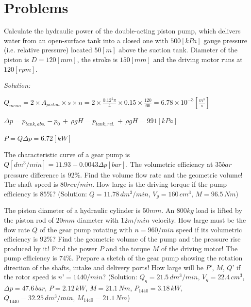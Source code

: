 \section{Problems}


Calculate the hydraulic power of the double-acting piston pump, which delivers water from an open-surface tank into a closed one with $500[kPa]$ gauge pressure (i.e. relative pressure) located $50[m]$ above the suction tank. Diameter of the piston is $D=120[mm]$, the stroke is $150[mm]$ and the driving motor runs at $120[rpm]$.

\emph{Solution:} 

$Q_{mean}=2 \times A_{piston} \times s \times n=2\times \frac{0.12^2 \pi}{4} \times 0.15 \times \frac{120}{60} =6.78 \times 10^{-3} [\frac{m^3}{s}]$

$\Delta p=p_{tank,abs.}-p_0\,+\,\rho g H=p_{tank,rel.}\,+\,\rho g H=991[kPa]$

$P=Q \Delta p=6.72[kW]$


\vspace{1cm}

The characteristic curve of a gear pump is $Q[dm^3/min]=11.93-0.0043 \Delta p [bar]$. The volumetric efficiency at $35 bar$ pressure difference is $92\%$. Find the volume flow rate and the geometric volume! The shaft speed is $80 rev/min$. How large is the driving torque if the pump efficiency is $85\%$? (Solution: $Q=11.78\,dm^3/min$, $V_g = 160\,cm^3$, $M = 96.5\,Nm$)


\vspace{1cm}

The piston diameter of a hydraulic cylinder is $50 mm$. An $800 kg$ load is lifted by the piston rod of $20 mm$ diameter with $12 m/min$ velocity. How large must be the flow rate $Q$ of the gear pump rotating with $n = 960/min$ speed if its volumetric efficiency is $92\%$? Find the geometric volume of the pump and the pressure rise produced by it! Find the power $P$ and the torque $M$ of the driving motor! The pump efficiency is $74\%$. Prepare a sketch of the gear pump showing the rotation direction of the shafts, intake and delivery ports! How large will be $P’$, $M$, $Q’$ if the rotor speed is $n’ = 1440/min$? (Solution: $Q_g = 21.5\,dm^3/min$, $V_g = 22.4\,cm^3$, $\Delta p = 47.6\,bar$, $P=2.12\,kW$, $M=21.1\,Nm$, $P_{1440}=3.18\,kW$, $Q_{1440} = 32.25\,dm^3/min$, $M_{1440}=21.1\,Nm$)

